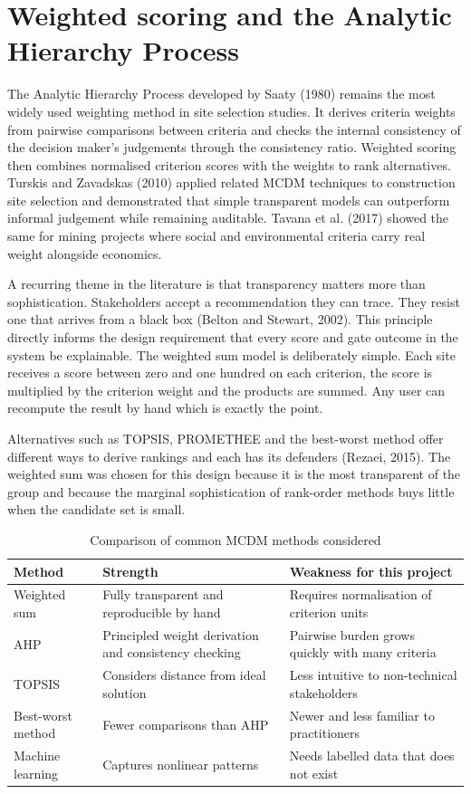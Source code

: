\documentclass[12pt,a4paper]{report}
\begin{document}
\section{Weighted scoring and the Analytic Hierarchy Process}
The Analytic Hierarchy Process developed by Saaty (1980) remains the
most widely used weighting method in site selection studies. It derives
criteria weights from pairwise comparisons between criteria and checks
the internal consistency of the decision maker's judgements through the
consistency ratio. Weighted scoring then combines normalised criterion
scores with the weights to rank alternatives. Turskis and Zavadskas
(2010) applied related MCDM techniques to construction site selection
and demonstrated that simple transparent models can outperform informal
judgement while remaining auditable. Tavana et al. (2017) showed the
same for mining projects where social and environmental criteria carry
real weight alongside economics.

A recurring theme in the literature is that transparency matters more
than sophistication. Stakeholders accept a recommendation they can
trace. They resist one that arrives from a black box (Belton and
Stewart, 2002). This principle directly informs the design requirement
that every score and gate outcome in the system be explainable. The
weighted sum model is deliberately simple. Each site receives a score
between zero and one hundred on each criterion, the score is multiplied
by the criterion weight and the products are summed. Any user can
recompute the result by hand which is exactly the point.

Alternatives such as TOPSIS, PROMETHEE and the best-worst method offer
different ways to derive rankings and each has its defenders (Rezaei,
2015). The weighted sum was chosen for this design because it is the
most transparent of the group and because the marginal sophistication
of rank-order methods buys little when the candidate set is small.

\begin{table}[h]
\centering
\caption{Comparison of common MCDM methods considered}
\begin{tabular}{p{3.2cm}p{4.6cm}p{4.6cm}}
\toprule
Method & Strength & Weakness for this project \\
\midrule
Weighted sum & Fully transparent and reproducible by hand & Requires
normalisation of criterion units \\
AHP & Principled weight derivation and consistency checking & Pairwise
burden grows quickly with many criteria \\
TOPSIS & Considers distance from ideal solution & Less intuitive to
non-technical stakeholders \\
Best-worst method & Fewer comparisons than AHP & Newer and less
familiar to practitioners \\
Machine learning & Captures nonlinear patterns & Needs labelled data
that does not exist \\
\bottomrule
\end{tabular}
\end{table}
\end{document}
